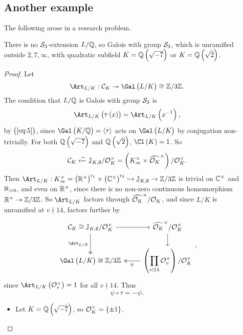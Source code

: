\pagebreak

\subsection{Another example}


The following arose in a research problem.

\begin{proposition}
There is no $ \mathcal{S}_3 $-extension $ L / \mathbb{Q} $, so Galois with group $ \mathcal{S}_3 $, which is unramified outside $ 2, 7, \infty $, with quadratic subfield $ K = \QQ\br{\sqrt{-7}} $ or $ K = \QQ\br{\sqrt{2}} $.
\end{proposition}

\begin{proof}
Let
$$ \Art_{L / K} : \CCC_K \twoheadrightarrow \Gal\br{L / K} \cong \ZZ / 3\ZZ. $$
The condition that $ L / \mathbb{Q} $ is Galois with group $ \mathcal{S}_3 $ is
$$ \Art_{L / K}\br{\tau\br{x}} = \Art_{L / K}\br{x^{-1}}, $$
by $ \br{\ref{eq:5}} $, since $ \Gal\br{K / \QQ} = \abr{\tau} $ acts on $ \Gal\br{L / K} $ by conjugation non-trivially. For both $ \QQ\br{\sqrt{-7}} $ and $ \QQ\br{\sqrt{2}} $, $ \Cl\br{K} = 1 $. So
$$ \CCC_K \xleftarrow{\sim} \JJ_{K, \emptyset} / \OOO_K^\times = \br{K_\infty^\times \times \widehat{\OOO_K}^\times} / \OOO_K^\times. $$
Then $ \Art_{L / K} : K_\infty^\times = \br{\RR^\times}^{\r_1} \times \br{\CC^\times}^{\r_2} \hookrightarrow \JJ_{K, \emptyset} \to \ZZ / 3\ZZ $ is trivial on $ \mathbb{C}^\times $ and $ \mathbb{R}_{> 0} $, and even on $ \mathbb{R}^\times $, since there is no non-zero continuous homomorphism $ \mathbb{R}^\times \to \mathbb{Z} / 3\mathbb{Z} $. So $ \Art_{L / K} $ factors through $ \widehat{\mathcal{O}_K}^\times / \mathcal{O}_K $, and since $ L / K $ is unramified at $ v \nmid 14 $, factors further by
$$
\begin{tikzcd}
\CCC_K \cong \JJ_{K, \emptyset} / \OOO_K^\times \arrow{r} \arrow[twoheadrightarrow]{d}[swap]{\Art_{L / K}} & \widehat{\OOO_K}^\times / \OOO_K^\times \arrow{d} \\
\Gal\br{L / K} \cong \ZZ / 3\ZZ & \br{\displaystyle\prod_{v \mid 14} \OOO_v^\times} / \OOO_K^\times \arrow[twoheadrightarrow]{l}{\psi}
\end{tikzcd},
$$
since $ \Art_{L / K}\br{\OOO_v^\times} = 1 $ for all $ v \nmid 14 $. Thus
\begin{equation}
\label{eq:6}
\psi \circ \tau = -\psi.
\end{equation}
\begin{itemize}
\item Let $ K = \QQ\br{\sqrt{-7}} $, so $ \OOO_K^\times = \cbr{\pm 1} $.

\end{itemize}
\end{proof}

